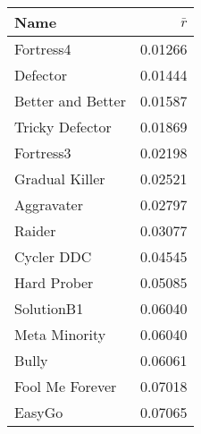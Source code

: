 \begin{tabular}{lr}
\toprule
Name              &               $\bar{r}$           \\
\midrule
Fortress4         &                           0.01266 \\
Defector          &                           0.01444 \\
Better and Better &                           0.01587 \\
Tricky Defector   &                           0.01869 \\
Fortress3         &                           0.02198 \\
Gradual Killer    &                           0.02521 \\
Aggravater        &                           0.02797 \\
Raider            &                           0.03077 \\
Cycler DDC        &                           0.04545 \\
Hard Prober       &                           0.05085 \\
SolutionB1        &                           0.06040 \\
Meta Minority     &                           0.06040 \\
Bully             &                           0.06061 \\
Fool Me Forever   &                           0.07018 \\
EasyGo            &                           0.07065 \\
\bottomrule
\end{tabular}
